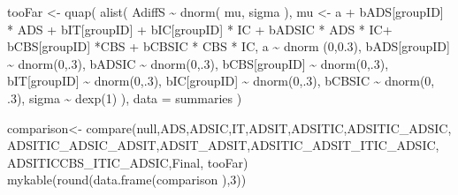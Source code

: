 \documentclass[
  10pt,
  dvipsnames,enabledeprecatedfontcommands]{scrartcl}
\newenvironment{Shaded}{\begin{snugshade}}{\end{snugshade}}
\newcommand{\AttributeTok}[1]{\textcolor[rgb]{0.77,0.63,0.00}{#1}}
\newcommand{\DecValTok}[1]{\textcolor[rgb]{0.00,0.00,0.81}{#1}}
\newcommand{\FloatTok}[1]{\textcolor[rgb]{0.00,0.00,0.81}{#1}}
\newcommand{\FunctionTok}[1]{\textcolor[rgb]{0.00,0.00,0.00}{#1}}
\newcommand{\NormalTok}[1]{#1}
\newcommand{\OtherTok}[1]{\textcolor[rgb]{0.56,0.35,0.01}{#1}}
\newcommand{\SpecialCharTok}[1]{\textcolor[rgb]{0.00,0.00,0.00}{#1}}
\begin{document}
\begin{Shaded}
\begin{Highlighting}[]
\NormalTok{tooFar }\OtherTok{\textless{}{-}} \FunctionTok{quap}\NormalTok{(}
  \FunctionTok{alist}\NormalTok{(}
\NormalTok{    AdiffS }\SpecialCharTok{\textasciitilde{}} \FunctionTok{dnorm}\NormalTok{( mu, sigma ),}
\NormalTok{    mu }\OtherTok{\textless{}{-}}\NormalTok{ a }\SpecialCharTok{+}\NormalTok{ bADS[groupID] }\SpecialCharTok{*}\NormalTok{ ADS }\SpecialCharTok{+}\NormalTok{  bIT[groupID] }\SpecialCharTok{+}\NormalTok{ bIC[groupID] }\SpecialCharTok{*}\NormalTok{ IC }\SpecialCharTok{+} 
\NormalTok{      bADSIC }\SpecialCharTok{*}\NormalTok{ ADS }\SpecialCharTok{*}\NormalTok{ IC}\SpecialCharTok{+}\NormalTok{ bCBS[groupID] }\SpecialCharTok{*}\NormalTok{CBS }\SpecialCharTok{+}\NormalTok{ bCBSIC }\SpecialCharTok{*}\NormalTok{ CBS }\SpecialCharTok{*}\NormalTok{ IC, }
\NormalTok{    a }\SpecialCharTok{\textasciitilde{}} \FunctionTok{dnorm}\NormalTok{ (}\DecValTok{0}\NormalTok{,}\FloatTok{0.3}\NormalTok{),}
\NormalTok{    bADS[groupID] }\SpecialCharTok{\textasciitilde{}} \FunctionTok{dnorm}\NormalTok{(}\DecValTok{0}\NormalTok{,.}\DecValTok{3}\NormalTok{),}
\NormalTok{    bADSIC }\SpecialCharTok{\textasciitilde{}} \FunctionTok{dnorm}\NormalTok{(}\DecValTok{0}\NormalTok{,.}\DecValTok{3}\NormalTok{),}
\NormalTok{    bCBS[groupID] }\SpecialCharTok{\textasciitilde{}} \FunctionTok{dnorm}\NormalTok{(}\DecValTok{0}\NormalTok{,.}\DecValTok{3}\NormalTok{),}
\NormalTok{    bIT[groupID] }\SpecialCharTok{\textasciitilde{}} \FunctionTok{dnorm}\NormalTok{(}\DecValTok{0}\NormalTok{,.}\DecValTok{3}\NormalTok{),}
\NormalTok{    bIC[groupID] }\SpecialCharTok{\textasciitilde{}} \FunctionTok{dnorm}\NormalTok{(}\DecValTok{0}\NormalTok{,.}\DecValTok{3}\NormalTok{),}
\NormalTok{     bCBSIC }\SpecialCharTok{\textasciitilde{}} \FunctionTok{dnorm}\NormalTok{(}\DecValTok{0}\NormalTok{, .}\DecValTok{3}\NormalTok{),}
\NormalTok{    sigma  }\SpecialCharTok{\textasciitilde{}} \FunctionTok{dexp}\NormalTok{(}\DecValTok{1}\NormalTok{)}
\NormalTok{  ), }
  \AttributeTok{data =}\NormalTok{ summaries}
\NormalTok{)}
\end{Highlighting}
\end{Shaded}

\normalsize

\vspace{1mm}
\footnotesize

\begin{Shaded}
\begin{Highlighting}[]
\NormalTok{comparison}\OtherTok{\textless{}{-}} \FunctionTok{compare}\NormalTok{(null,ADS,ADSIC,IT,ADSIT,ADSITIC,ADSITIC\_ADSIC,}
\NormalTok{                     ADSITIC\_ADSIC\_ADSIT,ADSIT\_ADSIT,ADSITIC\_ADSIT\_ITIC\_ADSIC,}
\NormalTok{                     ADSITICCBS\_ITIC\_ADSIC,Final, tooFar)}
\FunctionTok{mykable}\NormalTok{(}\FunctionTok{round}\NormalTok{(}\FunctionTok{data.frame}\NormalTok{(comparison ),}\DecValTok{3}\NormalTok{)) }
\end{Highlighting}
\end{Shaded}
\end{document}
